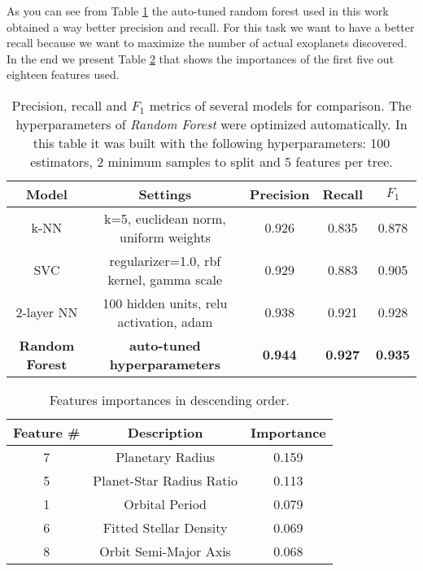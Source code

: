 \documentclass[11pt, a4paper]{article}
\begin{document}
\begin{multicols}{2}
  As you can see from Table \ref{table:benchmark} the auto-tuned random forest used in this work obtained a way better precision and recall. For this task we want to have a better recall because we want to maximize the number of actual exoplanets discovered.
  In the end we present Table \ref{table:importances} that shows the importances of the first five out eighteen features used.
\end{multicols}

  \begin{table}
    \centering
    \begin{tabular}{|c c c c c|}
      \hline
      Model & Settings & Precision & Recall & $F_{1}$  \\
      \hline\hline
      k-NN & k=5, euclidean norm, uniform weights & 0.926 & 0.835 & 0.878 \\
      \hline
      SVC & regularizer=1.0, rbf kernel, gamma scale & 0.929 & 0.883 & 0.905 \\
      \hline
      2-layer NN & 100 hidden units, relu activation, adam & 0.938 & 0.921 & 0.928 \\
      \hline
      \textbf{Random Forest} & \textbf{auto-tuned hyperparameters} & \textbf{0.944} & \textbf{0.927} & \textbf{0.935} \\
      \hline
    \end{tabular}
    \caption{Precision, recall and $F_{1}$ metrics of several models for comparison. The hyperparameters of \textit{Random Forest} were optimized automatically. In this table it was built with the following hyperparameters: 100 estimators, 2 minimum samples to split and 5 features per tree.}
    \label{table:benchmark}
  \end{table}

  \begin{table}
    \centering
    \begin{tabular}{|c c c|}
    \hline
    Feature \# & Description & Importance \\
    \hline\hline
    7 & Planetary Radius & 0.159 \\
    5 & Planet-Star Radius Ratio & 0.113 \\
    1 & Orbital Period & 0.079 \\
    6 & Fitted Stellar Density & 0.069 \\
    8 & Orbit Semi-Major Axis & 0.068 \\
    \hline
    \end{tabular}
    \caption{Features importances in descending order.}
    \label{table:importances}
  \end{table}
\end{document}
